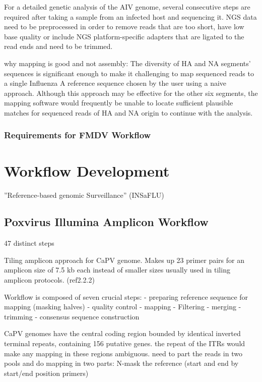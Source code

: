For a detailed genetic analysis of the AIV genome, several consecutive steps are required after taking a sample from an infected host and sequencing it. NGS data need to be preprocessed in order to remove reads that are too short, have low base quality or include NGS platform-specific adapters that are ligated to the read ends and need to be trimmed.

why mapping is good and not assembly:
The diversity of HA and NA segments' sequences is significant enough to make it challenging to map sequenced reads to a single Influenza A reference sequence chosen by the user using a naive approach. Although this approach may be effective for the other six segments, the mapping software would frequently be unable to locate sufficient plausible matches for sequenced reads of HA and NA origin to continue with the analysis.

\subsubsection{Requirements for FMDV Workflow}

\section{Workflow Development}
''Reference-based genomic Surveillance'' (INSaFLU)

\subsection{Poxvirus Illumina Amplicon Workflow}
47 distinct steps

Tiling amplicon approach for CaPV genome. Makes up 23 primer pairs for an amplicon size of 7.5 kb each instead of smaller sizes usually used in tiling amplicon protocols. (ref2.2.2)

Workflow is composed of seven crucial steps:
- preparing reference sequence for mapping (masking halves)
- quality control
- mapping
- Filtering
- merging
- trimming
- consensus sequence construction

CaPV genomes have the central coding region bounded by identical inverted terminal repeats,
containing 156 putative genes. the repeat of the ITRs would make any mapping in these regions ambiguous.
need to part the reads in two pools and do mapping in two parts: N-mask the reference (start and end by start/end position primers)

